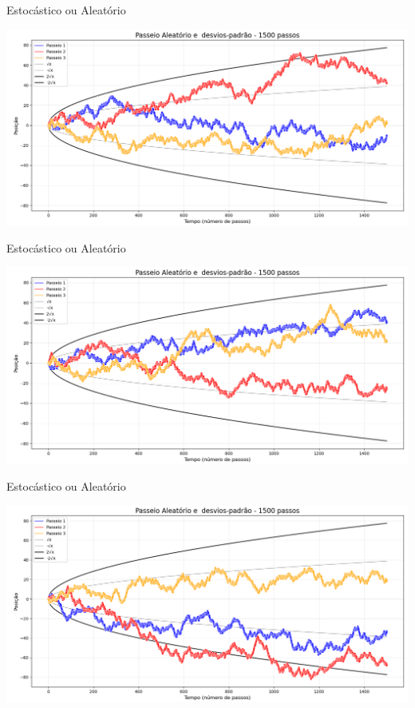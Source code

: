 \documentclass{beamer}
\begin{document}
\begin{frame}{Estocástico ou Aleatório}

\includegraphics[width=\textwidth]{srw3.png}

\end{frame}

\begin{frame}{Estocástico ou Aleatório}

\includegraphics[width=\textwidth]{srw4.png}

\end{frame}

\begin{frame}{Estocástico ou Aleatório}

\includegraphics[width=\textwidth]{srw5.png}

\end{frame}
\end{document}
